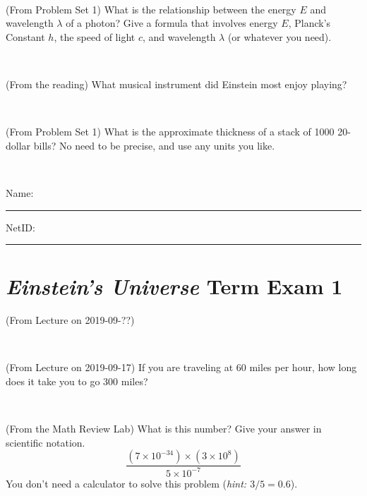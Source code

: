 \documentclass[12pt, letterpaper]{article}
\begin{document}
\vfill ~

\begin{problem} (From Problem Set 1)
What is the relationship between the energy $E$ and wavelength
$\lambda$ of a photon? Give a formula that involves energy $E$,
Planck's Constant $h$, the speed of light $c$, and wavelength
$\lambda$ (or whatever you need).
\end{problem}

\vfill ~

\begin{problem} (From the reading)
What musical instrument did Einstein most enjoy playing?
\end{problem}


\vfill ~

\begin{problem} (From Problem Set 1)
What is the approximate thickness of a stack of 1000 20-dollar bills?
No need to be precise, and use any units you like.
\end{problem}


\vfill ~


\cleardoublepage



\noindent
Name: \rule[-1ex]{0.60\textwidth}{0.1pt}
NetID: \rule[-1ex]{0.20\textwidth}{0.1pt}

\section*{\textsl{Einstein's Universe} Term Exam 1}
\setcounter{problem}{1}


\begin{problem} (From Lecture on 2019-09-??)
\end{problem}


\vfill ~

\begin{problem} (From Lecture on 2019-09-17)
If you are traveling at 60 miles per hour, how long does
it take you to go 300 miles?
\end{problem}


\vfill ~

\begin{problem} (From the Math Review Lab)
What is this number? Give your answer in scientific notation.
$$
\frac{(7\times10^{-34})\times(3\times10^8)}{5\times10^{-7}}
$$
You don't need a calculator to solve this problem (\textit{hint: $3/5=0.6$}).
\end{problem}


\vfill ~
\end{document}
